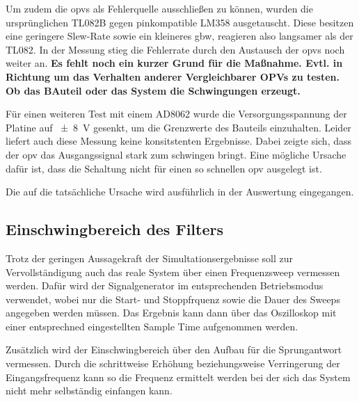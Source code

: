 \documentclass[../main_config.tex]{subfiles}
\begin{document}
Um zudem die \glspl{opv} als Fehlerquelle ausschließen zu können, wurden die ursprünglichen TL082B gegen pinkompatible LM358 ausgetauscht. Diese besitzen eine geringere Slew-Rate sowie ein kleineres \gls{gbw}, reagieren also langsamer als der TL082. In der Messung stieg die Fehlerrate durch den Austausch der \glspl{opv} noch weiter an. \textbf{Es fehlt noch ein kurzer Grund für die Maßnahme. Evtl. in Richtung um das Verhalten anderer Vergleichbarer OPVs zu testen. Ob das BAuteil oder das System die Schwingungen erzeugt.  }\par
\medskip

Für einen weiteren Test mit einem AD8062 wurde die Versorgungsspannung der Platine auf \SI{\pm8}{\volt} gesenkt, um die Grenzwerte des Bauteils einzuhalten. Leider liefert auch diese Messung keine konsitstenten Ergebnisse. Dabei zeigte sich, dass der \gls{opv} das Ausgangssignal stark zum schwingen bringt. Eine mögliche Ursache dafür ist, dass die Schaltung nicht für einen so schnellen \gls{opv} ausgelegt ist.\par
\medskip 


Die auf die tatsächliche Ursache wird ausführlich in der Auswertung eingegangen.\par
\medskip





\subsection{Einschwingbereich des Filters}

Trotz der geringen Aussagekraft der Simultationsergebnisse soll zur Vervollständigung auch das reale System über einen Frequenzsweep vermessen werden. Dafür wird der Signalgenerator im entsprechenden Betriebsmodus verwendet, wobei nur die Start- und Stoppfrquenz sowie die Dauer des Sweeps angegeben werden müssen. Das Ergebnis kann dann über das Oszilloskop mit einer entsprechned eingestellten Sample Time aufgenommen werden.\par
\medskip

Zusätzlich wird der Einschwingbereich über den Aufbau für die Sprungantwort vermessen. Durch die schrittweise Erhöhung beziehungsweise Verringerung der Eingangsfrequenz kann so die Frequenz ermittelt werden bei der sich das System nicht mehr selbständig einfangen kann. \par
\medskip




\end{document}

